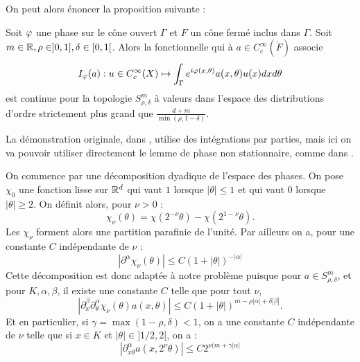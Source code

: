 On peut alors énoncer la proposition suivante :
\begin{prop}
Soit $\varphi$ une phase sur le cône ouvert $\Gamma$ et $F$ un cône fermé inclus dans $\Gamma$. Soit $m \in \mathbb{R},\rho \in ]0,1],\delta \in [0,1[$. Alors la fonctionnelle qui à $a \in C^{\infty}_c\left(\mathring{F}\right)$ associe 
\begin{equation}
  \label{eq:IF}
  I_{\varphi}(a) : u \in C^{\infty}_c(X) \mapsto \int_{\Gamma}e^{i\varphi(x,\theta)}a(x,\theta)u(x)dxd\theta
\end{equation}
est continue pour la topologie $S^m_{\rho,\delta}$ à valeurs dans l'espace des distributions d'ordre strictement plus grand que $\frac{d+m}{\min(\rho,1-\delta)}$.
\end{prop}
\begin{preuve}
La démonstration originale, dans \cite{hormander1971fourier}, utilise des intégrations par parties, mais ici on va pouvoir utiliser directement le lemme de phase non stationnaire, comme dans \cite{hormander2003analysis}.

On commence par une décomposition dyadique de l'espace des phases. On pose $\chi_0$ une fonction lisse sur $\mathbb{R}^d$ qui vaut $1$ lorsque $|\theta|\leq 1$ et qui vaut $0$ lorsque $|\theta| \geq 2$. On définit alors, pour $\nu > 0$ :
\begin{equation*}
  \chi_{\nu}(\theta)=\chi(2^{-\nu}\theta)-\chi(2^{1-\nu}\theta).
\end{equation*}
Les $\chi_{\nu}$ forment alors une partition parafinie de l'unité. Par ailleurs on a, pour une constante $C$ indépendante de $\nu$ :
\begin{equation*}
  |\partial^{\alpha}\chi_{\nu}(\theta)| \leq C(1+|\theta|)^{-|\alpha|}
\end{equation*}
Cette décomposition est donc adaptée à notre problème puisque pour $a \in S^m_{\rho,\delta}$, et pour $K,\alpha,\beta$, il existe une constante $C$ telle que pour tout $\nu$,
\begin{equation*}
  |\partial^{\beta}_x\partial^{\alpha}_{\theta}\chi_{\nu}(\theta)a(x,\theta)| \leq C(1+|\theta|)^{m-\rho|\alpha|+\delta|\beta|}.
\end{equation*}
Et en particulier, si $\gamma = \max(1-\rho,\delta)<1$, on a une constante $C$ indépendante de $\nu$ telle que si $x \in K$ et $|\theta|\in ]1/2,2[$, on a :
\begin{equation*}
  |\partial^{\alpha}_{x\theta}a(x,2^{\nu}\theta)| \leq C2^{\nu(m+\gamma |\alpha|}
\end{equation*}


\end{preuve}
